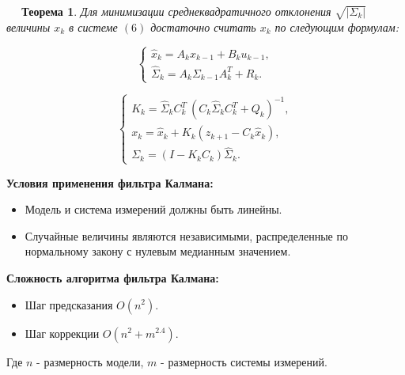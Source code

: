 \documentclass[12pt, a4paper]{article}
\newtheorem{theorem}{$\quad$ Теорема}
\begin{document}
\begin{theorem}
Для минимизации среднеквадратичного отклонения $\sqrt{\vert \Sigma_{k} \vert}$ величины $x_{k}$ в системе $(6)$ достаточно считать $x_k$ по следующим формулам:

\begin{equation}
\begin{cases}
\widehat{x}_{k} = A_{k}x_{k-1} + B_{k}u_{k-1}, \\
\widehat{\Sigma}_k = A_k\Sigma_{k-1}A_k^T + R_k.
\end{cases}
\end{equation}

\begin{equation}
\begin{cases}
K_k = \widehat{\Sigma}_k C_k^T \:(C_k \widehat{\Sigma}_k C_k^T + Q_k)^{-1}, \\
x_k = \widehat{x}_{k} + K_k(z_{k+1} - C_k \widehat{x}_{k}), \\
\Sigma_k = (I - K_k C_k)\widehat{\Sigma}_k.
\end{cases}
\end{equation}

\end{theorem}
\textbf{Условия применения фильтра Калмана:}
\begin{itemize}
\item Модель и система измерений должны быть линейны. \\


\item Случайные величины являются независимыми, распределенные по нормальному закону с нулевым медианным значением.
\end{itemize}
\textbf{Сложность алгоритма фильтра Калмана:}

\begin{itemize}
\item Шаг предсказания $O(n^2)$.
\item Шаг коррекции $O(n^2 + m^{2.4})$.
\end{itemize}
Где $n$ - размерность модели, $m$ - размерность системы измерений.
\end{document}
